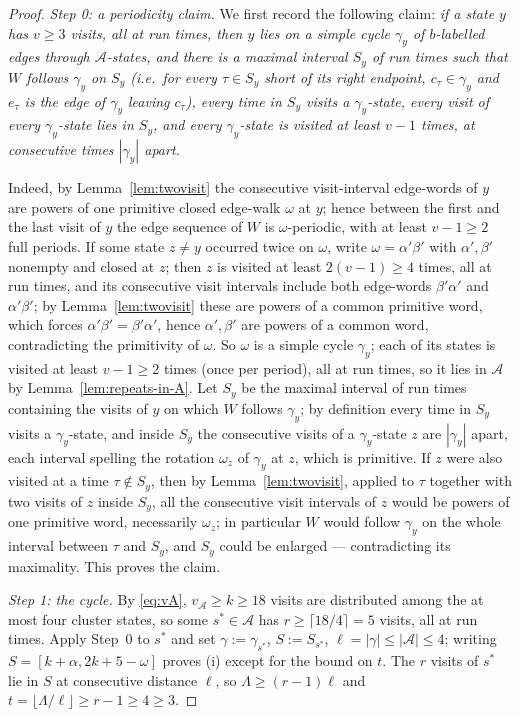 \documentclass[11pt]{article}
\theoremstyle{definition}
\begin{document}
\begin{proof}
\emph{Step 0: a periodicity claim.} We first record the following claim:
\emph{if a state $y$ has $v\ge3$ visits, all at run times, then $y$ lies on a
simple cycle $\gamma_y$ of $b$-labelled edges through $\mathcal A$-states,
and there is a maximal interval $S_y$ of run times such that $W$ follows
$\gamma_y$ on $S_y$ (i.e.\ for every $\tau\in S_y$ short of its right
endpoint, $c_\tau\in\gamma_y$ and $e_\tau$ is the edge of $\gamma_y$ leaving
$c_\tau$), every time in $S_y$ visits a $\gamma_y$-state, every visit of
every $\gamma_y$-state lies in $S_y$, and every $\gamma_y$-state is visited
at least $v-1$ times, at consecutive times $|\gamma_y|$ apart.}

Indeed, by Lemma~\ref{lem:twovisit} the consecutive visit-interval edge-words
of $y$ are powers of one primitive closed edge-walk $\omega$ at $y$; hence
between the first and the last visit of $y$ the edge sequence of $W$ is
$\omega$-periodic, with at least $v-1\ge2$ full periods. If some state
$z\ne y$ occurred twice on $\omega$, write $\omega=\alpha'\beta'$ with
$\alpha',\beta'$ nonempty and closed at $z$; then $z$ is visited at least
$2(v-1)\ge4$ times, all at run times, and its consecutive visit intervals
include both edge-words $\beta'\alpha'$ and $\alpha'\beta'$; by
Lemma~\ref{lem:twovisit} these are powers of a common primitive word, which
forces $\alpha'\beta'=\beta'\alpha'$, hence $\alpha',\beta'$ are powers of a
common word, contradicting the primitivity of $\omega$. So $\omega$ is a
simple cycle $\gamma_y$; each of its states is visited at least $v-1\ge2$
times (once per period), all at run times, so it lies in $\mathcal A$ by
Lemma~\ref{lem:repeats-in-A}. Let $S_y$ be the maximal interval of run times
containing the visits of $y$ on which $W$ follows $\gamma_y$; by definition
every time in $S_y$ visits a $\gamma_y$-state, and inside $S_y$ the
consecutive visits of a $\gamma_y$-state $z$ are $|\gamma_y|$ apart, each
interval spelling the rotation $\omega_z$ of $\gamma_y$ at $z$, which is
primitive. If $z$ were also visited at a time $\tau\notin S_y$, then by
Lemma~\ref{lem:twovisit}, applied to $\tau$ together with two visits of $z$
inside $S_y$, all the consecutive visit intervals of $z$ would be powers of
one primitive word, necessarily $\omega_z$; in particular $W$ would follow
$\gamma_y$ on the whole interval between $\tau$ and $S_y$, and $S_y$ could
be enlarged --- contradicting its maximality. This proves the claim.

\emph{Step 1: the cycle.} By \eqref{eq:vA}, $v_{\mathcal A}\ge k\ge18$
visits are distributed among the at most four cluster states, so some
$s^*\in\mathcal A$ has $r\ge\lceil 18/4\rceil=5$ visits, all at run times.
Apply Step~0 to $s^*$ and set $\gamma:=\gamma_{s^*}$, $S:=S_{s^*}$,
$\ell=|\gamma|\le|\mathcal A|\le4$; writing $S=[k+\alpha,2k+5-\omega]$
proves (i) except for the bound on $t$. The $r$ visits of $s^*$ lie in $S$
at consecutive distance $\ell$, so $\Lambda\ge(r-1)\ell$ and
$t=\lfloor\Lambda/\ell\rfloor\ge r-1\ge4\ge3$.


\end{proof}
\end{document}
